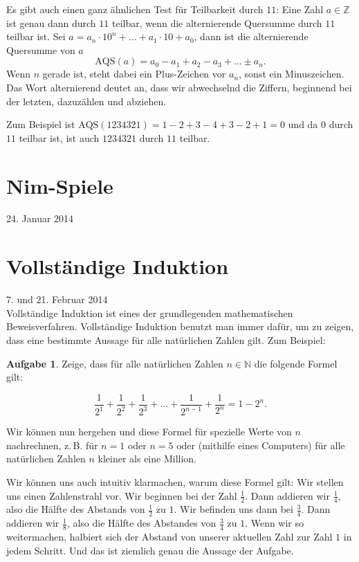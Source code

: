 \documentclass[a4paper,ngerman,12pt]{scrartcl}
\newcommand{\N}{\mathbb{N}}
\newcommand{\Z}{\mathbb{Z}}
\newcommand{\datum}[1]{\hfill {#1}\\}
\theoremstyle{definition}
\newtheorem*{aufg}{Aufgabe}
\begin{document}
Es gibt auch einen ganz ähnlichen Test für Teilbarkeit durch $11$: Eine Zahl $a \in \Z$ ist genau dann durch $11$ teilbar, wenn die alternierende Quersumme durch $11$ teilbar ist. Sei $a = a_n \cdot 10^n + ... + a_1 \cdot 10 + a_0$, dann ist die alternierende Quersumme von $a$
\[ \mathrm{AQS}(a) = a_0 - a_1 + a_2 - a_3 + ... \pm a_n. \]
Wenn $n$ gerade ist, steht dabei ein Plus-Zeichen vor $a_n$, sonst ein Minuszeichen. Das Wort alternierend deutet an, dass wir abwechselnd die Ziffern, beginnend bei der letzten, dazuzählen und abziehen.

Zum Beispiel ist $\mathrm{AQS}(1234321) = 1 - 2 + 3 - 4 + 3 - 2 + 1 = 0$ und da $0$ durch $11$ teilbar ist, ist auch $1234321$ durch $11$ teilbar.


\section{Nim-Spiele}

\datum{24. Januar 2014}


\section{Vollständige Induktion}

\datum{7. und 21. Februar 2014}

Vollständige Induktion ist eines der grundlegenden mathematischen Beweisverfahren. Vollständige Induktion benutzt man immer dafür, um zu zeigen, dass eine bestimmte Aussage für alle natürlichen Zahlen gilt. Zum Beispiel:

\begin{aufg}
  Zeige, dass für alle natürlichen Zahlen $n \in \N$ die folgende Formel gilt:

  \[ \frac{1}{2^1} + \frac{1}{2^2} + \frac{1}{2^3} + ... + \frac{1}{2^{n-1}} + \frac{1}{2^n} = 1 - 2^n. \]
\end{aufg}

Wir können nun hergehen und diese Formel für spezielle Werte von $n$ nachrechnen, z.\,B. für $n=1$ oder $n=5$ oder (mithilfe eines Computers) für alle natürlichen Zahlen $n$ kleiner als eine Million.

Wir können uns auch intuitiv klarmachen, warum diese Formel gilt: Wir stellen uns einen Zahlenstrahl vor. Wir beginnen bei der Zahl $\frac{1}{2}$. Dann addieren wir $\frac{1}{4}$, also die Hälfte des Abstands von $\frac{1}{2}$ zu $1$. Wir befinden uns dann bei $\frac{3}{4}$. Dann addieren wir $\frac{1}{8}$, also die Hälfte des Abstandes von $\frac{3}{4}$ zu $1$. Wenn wir so weitermachen, halbiert sich der Abstand von unserer aktuellen Zahl zur Zahl $1$ in jedem Schritt. Und das ist ziemlich genau die Aussage der Aufgabe.
\end{document}
